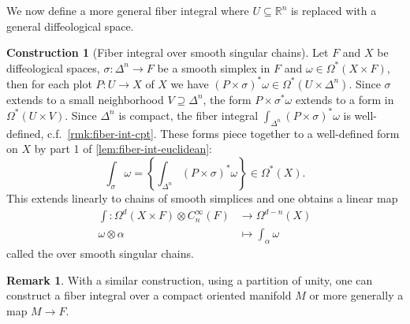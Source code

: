 \documentclass{scrartcl}
\let\emph\relax
\theoremstyle{plain}
\theoremstyle{definition}
\newtheorem{remark}[theorem]{Remark}
\newtheorem{construction}[theorem]{Construction}
\newcommand{\R}{\mathbb R}
\renewcommand{\subset}{\subseteq}
\renewcommand{\supset}{\supseteq}
\begin{document}
We now define a more general fiber integral where $U\subset \R^n$ is replaced with a general diffeological space.



\begin{construction}[Fiber integral over smooth singular chains]
    Let $F$ and $X$ be diffeological spaces, $\sigma\colon\Delta^n\to F$ be a smooth simplex in $F$ and $\omega\in\Omega^*(X\times F)$, then for each plot $P\colon U\to X$ of $X$ we have $(P\times\sigma)^*\omega\in\Omega^*(U\times \Delta^n)$. Since $\sigma$ extends to a small neighborhood $V\supset \Delta^n$, the form $P\times\sigma^*\omega$ extends to a form in $\Omega^*(U\times V)$. Since $\Delta^n$ is compact, the fiber integral $\int_{\Delta^n} (P\times\sigma)^*\omega$ is well-defined, c.f.\ \cref{rmk:fiber-int-cpt}. These forms piece together to a well-defined form on $X$ by part 1 of \cref{lem:fiber-int-euclidean}: 
    $$\int_\sigma \omega = \left\{\int_{\Delta^n} (P\times\sigma)^*\omega\right\}\in\Omega^*(X).$$
    This extends linearly to chains of smooth simplices and one obtains a linear map
    \begin{align*} \int\colon\Omega^d(X\times F) \otimes C_n^\infty(F)&\to\Omega^{d-n}(X)\\
        \omega\otimes \alpha&\mapsto \int_\alpha\omega
    \end{align*}
    called the \emph{fiber integral} over smooth singular chains.
\end{construction}

\begin{remark}
    With a similar construction, using a partition of unity, one can construct a fiber integral over a compact oriented manifold $M$ or more generally a map $M\to F$.
\end{remark}
\end{document}
